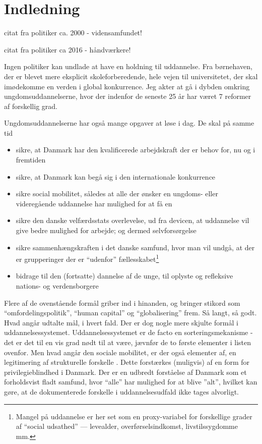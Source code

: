 \section{Indledning}

citat fra politiker ca. 2000 - vidensamfundet!

citat fra politiker ca 2016 - håndværkere!

Ingen politiker kan undlade at have en holdning til uddannelse.
Fra børnehaven, der er blevet mere eksplicit skoleforberedende, hele vejen til universitetet, der skal imødekomme en verden i global konkurrence.
Jeg akter at gå i dybden omkring ungdomsuddannelserne, hvor der indenfor de seneste 25 år har været 7 reformer af forskellig grad.

Ungdomsuddannelserne har også mange opgaver at løse i dag.
De skal på samme tid
\begin{itemize}
  \item
    sikre, at Danmark har den kvalificerede arbejdskraft der er behov for, nu og i fremtiden
  \item
    sikre, at Danmark kan begå sig i den internationale konkurrence
  \item
    sikre social mobilitet, således at alle der ønsker en ungdoms- eller videregående uddannelse har mulighed for at få en
  \item
    sikre den danske velfærdsstats overlevelse, ud fra devicen, at uddannelse vil give bedre mulighed for arbejde; og dermed selvforsørgelse 
  \item
    sikre sammenhængskraften i det danske samfund, hvor man vil undgå, at der er grupperinger der er “udenfor” fællesskabet\footnote{Mangel på uddannelse er her set som en proxy-variabel for forskellige grader af “social udsathed” — levealder, overførselsindkomst, livstilssygdomme mm.}
  \item
    bidrage til den (fortsatte) dannelse af de unge, til oplyste og refleksive nations- og verdensborgere
\end{itemize}

Flere af de ovenstående formål griber ind i hinanden, og bringer stikord som “omfordelingspolitik”, “human capital” og “globalisering” frem.
Så langt, så godt.
Hvad angår udtalte mål, i hvert fald.
Der er dog nogle mere skjulte formål i uddannelsessystemet.
Uddannelsessystemet er de facto en sorteringsmekanisme - det er det til en vis grad nødt til at være, jævnfør de to første elementer i listen ovenfor.
Men hvad angår den sociale mobilitet, er der også elementer af, en legitimering af strukturelle forskelle .
Dette forstærkes (muligvis) af en form for privilegieblindhed i Danmark.  
Der er en udbredt forståelse af Danmark som et forholdsvist fladt samfund, hvor “alle” har mulighed for at blive ”alt”, hvilket kan gøre, at de dokumenterede forskelle i uddannelsesudfald ikke tages alvorligt.

